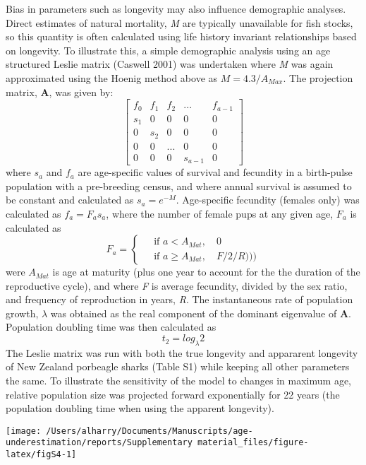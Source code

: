 \documentclass[]{article}
\begin{document}
Bias in parameters such as longevity may also influence demographic
analyses. Direct estimates of natural mortality, \emph{M} are typically
unavailable for fish stocks, so this quantity is often calculated using
life history invariant relationships based on longevity. To illustrate
this, a simple demographic analysis using an age structured Leslie
matrix (Caswell 2001) was undertaken where \emph{M} was again
approximated using the Hoenig method above as \(M = 4.3/A_{Max}\). The
projection matrix, \textbf{A}, was given by: \[\begin{bmatrix}
f_0 & f_1 & f_2 & ... & f_{a-1}\\ 
s_1 & 0 & 0 & 0 & 0\\ 
0 & s_2 & 0 & 0 & 0\\ 
0 & 0 & ... & 0 & 0\\ 
0 & 0 & 0 & s_{a-1}& 0
\end{bmatrix}\] where \(s_a\) and \(f_a\) are age-specific values of
survival and fecundity in a birth-pulse population with a pre-breeding
census, and where annual survival is assumed to be constant and
calculated as \(s_a = e^{-M}\). Age-specific fecundity (females only)
was calculated as \(f_a = F_a s_a\), where the number of female pups at
any given age, \(F_a\) is calculated as \[ F_a = \begin{cases}
 & \text{ if } a<A_{Mat}, \quad 0\\ 
 & \text{ if } a\geq A_{Mat}, \quad F/2/R))) 
\end{cases}\] were \(A_{Mat}\) is age at maturity (plus one year to
account for the the duration of the reproductive cycle), and where
\emph{F} is average fecundity, divided by the sex ratio, and frequency
of reproduction in years, \emph{R}. The instantaneous rate of population
growth, \(\lambda\) was obtained as the real component of the dominant
eigenvalue of \textbf{A}. Population doubling time was then calculated
as \[t_2 = log_{\lambda}2\] The Leslie matrix was run with both the true
longevity and appararent longevity of New Zealand porbeagle sharks
(Table S1) while keeping all other parameters the same. To illustrate
the sensitivity of the model to changes in maximum age, relative
population size was projected forward exponentially for 22 years (the
population doubling time when using the apparent longevity).

\begin{center}\texttt{[image: /Users/alharry/Documents/Manuscripts/age-underestimation/reports/Supplementary material\_files/figure-latex/figS4-1]} \end{center}
\end{document}
